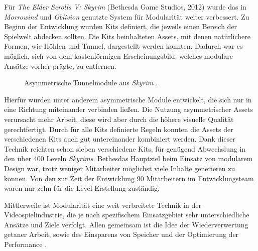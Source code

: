 \par
Für \textit{The Elder Scrolls V: Skyrim} (Bethesda Game Studios, 2012) wurde 
das in \textit{Morrowind} und \textit{Oblivion} genutzte System für Modularität weiter verbessert. Zu Beginn der Entwicklung wurden Kits definiert, die jeweils einen Bereich der Spielwelt abdecken sollten. Die Kits beinhalteten Assets, mit denen natürlichere Formen, wie Höhlen und Tunnel, dargestellt werden konnten. Dadurch war es möglich, sich von dem kastenförmigen Erscheinungsbild, welches modulare Ansätze vorher prägte, zu entfernen.
\begin{figure}[H]
\centering
  \caption{Asymmetrische Tunnelmodule aus \textit{Skyrim} \parencite{Burgess}.}
\label{ForHonorImage}
\end{figure}
\vspace{-10.5pt}
Hierfür wurden unter anderem asymmetrische Module entwickelt, die sich nur in eine Richtung miteinander verbinden ließen. Die Nutzung asymmetrischer Assets verursacht mehr Arbeit, diese wird aber durch die höhere visuelle Qualität gerechtfertigt. Durch für alle Kits definierte Regeln konnten die Assets der verschiedenen Kits auch gut untereinander kombiniert werden. Dank dieser Technik reichten schon sieben verschiedene Kits, für genügend Abwechslung in den über 400 Leveln \textit{Skyrims}. Bethesdas Hauptziel beim Einsatz von modularem Design war, trotz weniger Mitarbeiter möglichst viele Inhalte generieren zu können. Von den zur Zeit der Entwicklung 90 Mitarbeitern im Entwicklungsteam waren nur zehn für die Level-Erstellung zuständig. \parencite{Burgess}
\par
Mittlerweile ist Modularität eine weit verbreitete Technik in der Videospielindustrie, die je nach spezifischem Einsatzgebiet sehr unterschiedliche Ansätze und Ziele verfolgt. Allen gemeinsam ist die Idee der Wiederverwertung getaner Arbeit, sowie des Einsparens von Speicher und der Optimierung der Performance \parencite{Meler}.
